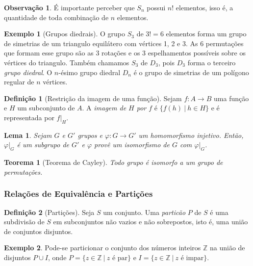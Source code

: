 \documentclass[a4paper,12pt]{report}
\theoremstyle{plain}
\newtheorem{teorema}{Teorema}[section]
\newtheorem{lema}{Lema}[section]
\theoremstyle{definition}
\newtheorem{definicao}{Definição}[section]
\newtheorem{observacao}{Observação}[section]
\newtheorem{exemplo}{Exemplo}[section]
\begin{document}
\begin{observacao}
	É importante perceber que $S_n$ possui $n!$ elementos, isso é, a quantidade de toda combinação de $n$ elementos.
\end{observacao}

\begin{exemplo}[Grupos diedrais]
	O grupo $S_3$ de $3! = 6$ elementos forma um grupo de simetrias de um triangulo equilátero com vértices 1, 2 e 3. As 6 permutações que formam esse grupo são as 3 rotações e os 3 espelhamentos possíveis sobre os vértices do triangulo. Também chamamos $S_3$ de $D_3$, pois $D_3$ forma o terceiro \emph{grupo diedral}. 
	O $n$-ésimo grupo diedral $D_n$ é o grupo de simetrias de um polígono regular de $n$ vértices.
\end{exemplo}

\begin{definicao}[Restrição da imagem de uma função]
	Sejam $f: A\longrightarrow B$ uma função e $H$ um subconjunto de $A$. A \emph{imagem de $H$ por $f$} é $\{f(h)\ |\ h \in H\}$ e é representada por $f|_H$.
\end{definicao}

\begin{lema}
	Sejam $G$ e $G'$ grupos e $\varphi:G\longrightarrow G'$ um homomorfismo injetivo. Então, $\varphi|_G$ é um subgrupo de $G'$ e $\varphi$ provê um isomorfismo de $G$ com $\varphi|_G$.
\end{lema}

\begin{teorema}[Teorema de Cayley]
	Todo grupo é isomorfo a um grupo de permutações.
\end{teorema}

\subsubsection{Relações de Equivalência e Partições}

\begin{definicao}[Partições]
	Seja \(S\) um conjunto. Uma \emph{particão} \(P\) de
	\(S\) é uma subdivisão de \(S\) em subconjuntos não vazios e não
	sobrepostos, isto é, uma união de conjuntos disjuntos.	
\end{definicao}

\begin{exemplo}
	Pode-se particionar o conjunto dos números inteiros
	\(\mathbb{Z}\) na união de disjuntos \(P\cup I\), onde
	\(P = \{z \in \mathbb{Z} \ |\ z \text{ é par}\}\) e
	\(I = \{z \in \mathbb{Z} \ |\ z \text{ é impar}\}\).
\end{exemplo}
\end{document}
